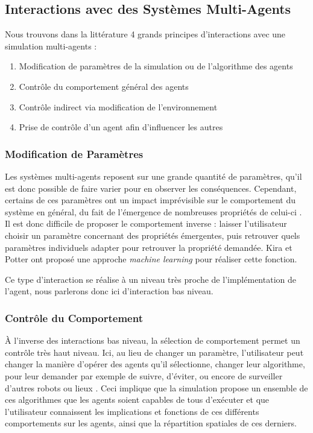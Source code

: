 		
		\subsection{Interactions avec des Systèmes Multi-Agents}
	
	
		Nous trouvons dans la littérature 4 grands principes d'interactions avec une simulation multi-agents \cite{kolling_human_2016} :
		\begin{enumerate}
			\item Modification de paramètres de la simulation ou de l'algorithme des agents
			\item Contrôle du comportement général des agents
			\item Contrôle indirect via modification de l'environnement
			\item Prise de contrôle d'un agent afin d'influencer les autres
		\end{enumerate}
		
		
	\subsubsection{Modification de Paramètres}
	Les systèmes multi-agents reposent sur une grande quantité de paramètres, qu'il est donc possible de faire varier pour en observer les conséquences. Cependant, certains de ces paramètres ont un impact imprévisible sur le comportement du système en général, du fait de l'émergence de nombreuses propriétés de celui-ci \cite{couzin_collective_2002}. Il est donc difficile de proposer le comportement inverse : laisser l'utilisateur choisir un paramètre concernant des propriétés émergentes, puis retrouver quels paramètres individuels adapter pour retrouver la propriété demandée. Kira et Potter \cite{kira_exerting_2009} ont proposé une approche \textit{machine learning} pour réaliser cette fonction.
	
	Ce type d'interaction se réalise à un niveau très proche de l'implémentation de l'agent, nous parlerons donc ici d'interaction bas niveau.
		
	\subsubsection{Contrôle du Comportement}
	À l'inverse des interactions bas niveau, la sélection de comportement permet un contrôle très haut niveau. Ici, au lieu de changer un paramètre, l'utilisateur peut changer la manière d'opérer des agents qu'il sélectionne, changer leur algorithme, pour leur demander par exemple de suivre, d'éviter, ou encore de surveiller d'autres robots ou lieux \cite{coppin_controlling_2012}. Ceci implique que la simulation propose un ensemble de ces algorithmes que les agents soient capables de tous d'exécuter et que l'utilisateur connaissent les implications et fonctions de ces différents comportements sur les agents, ainsi que la répartition spatiales de ces derniers.
	
